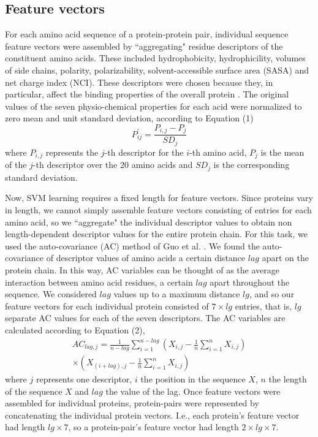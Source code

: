 \documentclass{acm_proc_article-sp}
\begin{document}
\subsection{Feature vectors}
For each amino acid sequence of a protein-protein pair, individual sequence feature vectors were assembled by ``aggregating" residue descriptors of the constituent amino acids. These included hydrophobicity, hydrophicility, volumes of side chains, polarity, polarizability, solvent-accessible surface area (SASA) and net charge index (NCI). These descriptors were chosen because they, in particular, affect the binding properties of the overall protein \cite{Guo}. The original values of the seven physio-chemical properties for each acid were normalized to zero mean and unit standard deviation, according to Equation (1)
\begin{equation}
P^{'}_{ij}=\frac{P_{i,j}-P_{j}}{SD_{j}}
\end{equation}
where $P_{i,j}$ represents the $j$-th descriptor for the $i$-th amino acid, $P_j$ is the mean of the $j$-th descriptor over the 20 amino acids and $SD_j$ is the corresponding standard deviation.

Now, SVM learning requires a fixed length for feature vectors. Since proteins vary in length, we cannot simply assemble feature vectors consisting of entries for each amino acid, so we ``aggregate" the individual descriptor values to obtain non length-dependent descriptor values for the entire protein chain. For this task, we used the auto-covariance (AC) method of Guo et al. \cite{Guo}. We found the auto-covariance of descriptor values of amino acids a certain distance $lag$ apart on the protein chain. In this way, AC variables can be thought of as the average interaction between amino acid residues, a certain $lag$ apart throughout the sequence. We considered $lag$ values up to a maximum distance $lg$, and so our feature vectors for each individual protein consisted of $7 \times lg $ entries, that is, $lg$ separate AC values for each of the seven descriptors. The AC variables are calculated according to Equation (2),
\begin{eqnarray}\nonumber
AC_{lag,j}=\frac{1}{n-lag}\sum_{i=1}^{n-lag} \left( X_{i,j}-\frac{1}{n}\sum_{i=1}^{n}X_{i,j}\right)\\
\times \left( X_{(i+lag),j}-\frac{1}{n}\sum_{i=1}^{n}X_{i,j}\right)
\end{eqnarray}
where $j$ represents one descriptor, $i$ the position in the sequence $X$, $n$ the length of the sequence $X$ and $lag$ the value of the lag. Once feature vectors were assembled for individual proteins, protein-pairs were represented by concatenating the individual protein vectors. I.e., each protein's feature vector had length $lg\times 7$, so a protein-pair's feature vector had length $2\times lg\times 7$.
\end{document}
